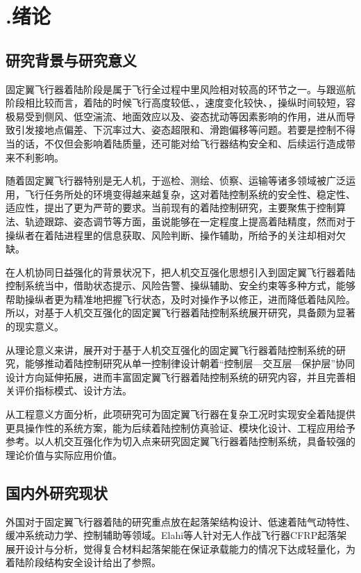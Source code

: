 
\chapter{.绪论}

\section{研究背景与研究意义}

固定翼飞行器着陆阶段是属于飞行全过程中里风险相对较高的环节之一。与跟巡航阶段相比较而言，着陆的时候飞行高度较低、，速度变化较快、，操纵时间较短，容极易受到侧风、低空湍流、地面效应以及、姿态扰动等因素影响的作用，进从而导致引发接地点偏差、下沉率过大、姿态超限和、滑跑偏移等问题。若要是控制不得当的话，不仅但会影响着陆质量，还可能对给飞行器结构安全和、后续运行造成带来不利影响。

随着固定翼飞行器特别是无人机，于巡检、测绘、侦察、运输等诸多领域被广泛运用，飞行任务所处的环境变得越来越复杂，这对着陆控制系统的安全性、稳定性、适应性，提出了更为严苛的要求。当前现有的着陆控制研究，主要聚焦于控制算法、轨迹跟踪、姿态调节等方面，虽说能够在一定程度上提高着陆精度，然而对于操纵者在着陆进程里的信息获取、风险判断、操作辅助，所给予的关注却相对欠缺。

在人机协同日益强化的背景状况下，把人机交互强化思想引入到固定翼飞行器着陆控制系统当中，借助状态提示、风险告警、操纵辅助、安全约束等多种方式，能够帮助操纵者更为精准地把握飞行状态，及时对操作予以修正，进而降低着陆风险。所以，对基于人机交互强化的固定翼飞行器着陆控制系统展开研究，具备颇为显著的现实意义。

从理论意义来讲，展开对于基于人机交互强化的固定翼飞行器着陆控制系统的研究，能够推动着陆控制研究从单一控制律设计朝着``控制层---交互层---保护层''协同设计方向延伸拓展，进而丰富固定翼飞行器着陆控制系统的研究内容，并且完善相关评价指标模式、设计方法。

从工程意义方面分析，此项研究可为固定翼飞行器在复杂工况时实现安全着陆提供更具操作性的系统方案，能为后续着陆控制仿真验证、模块化设计、工程应用给予参考。以人机交互强化作为切入点来研究固定翼飞行器着陆控制系统，具备较强的理论价值与实际应用价值。

\section{国内外研究现状}

外国对于固定翼飞行器着陆的研究重点放在起落架结构设计、低速着陆气动特性、缓冲系统动力学、控制辅助等领域。Elahi等人针对无人作战飞行器CFRP起落架展开设计与分析，觉得复合材料起落架能在保证承载能力的情况下达成轻量化，为着陆阶段结构安全设计给出了参照。

